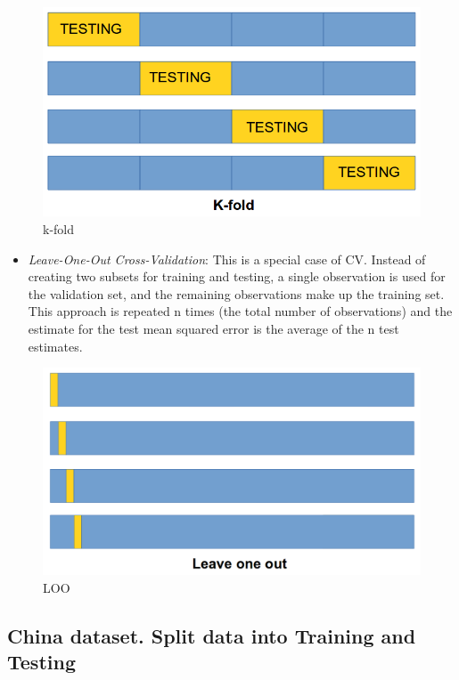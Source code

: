 \documentclass[]{book}
\providecommand{\tightlist}{%
  \setlength{\itemsep}{0pt}\setlength{\parskip}{0pt}}
\begin{document}
\begin{figure}[htbp]
\centering
\includegraphics{figures/kfold.png}
\caption{k-fold}
\end{figure}

\begin{itemize}
\tightlist
\item
  \emph{Leave-One-Out Cross-Validation}: This is a special case of CV.
  Instead of creating two subsets for training and testing, a single
  observation is used for the validation set, and the remaining
  observations make up the training set. This approach is repeated n
  times (the total number of observations) and the estimate for the test
  mean squared error is the average of the n test estimates.
\end{itemize}

\begin{figure}[htbp]
\centering
\includegraphics{figures/leaveone.png}
\caption{LOO}
\end{figure}

\subsection{China dataset. Split data into Training and
Testing}\label{china-dataset.-split-data-into-training-and-testing}
\end{document}
